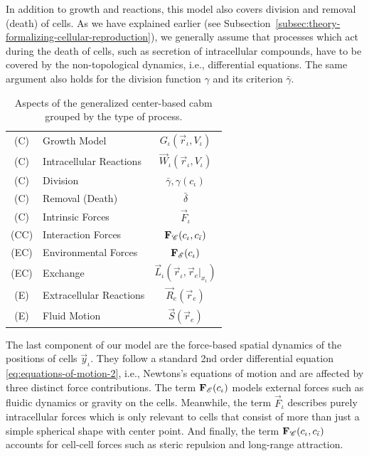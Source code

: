 In addition to growth and reactions, this model also covers division and removal (death) of cells.
As we have explained earlier (see Subsection~\ref{subsec:theory-formalizing-cellular-reproduction}),
we generally assume that processes which act during the death of cells, such as secretion of
intracellular compounds, have to be covered by the non-topological dynamics, i.e., differential
equations.
The same argument also holds for the division function $\gamma$ and its criterion $\bar{\gamma}$.

\begin{table}
    \centering
    \renewcommand{\arraystretch}{1.2}
    \begin{tabular}{clc}
        \toprule
        (C) & Growth Model              & $G_\iota(\vec{r}_\iota,V_\iota)$\\
        (C) & Intracellular Reactions   & $\vec{W}_\iota(\vec{r}_\iota,V_\iota)$\\
        (C) & Division                  & $\bar{\gamma},\gamma(c_\iota)$\\
        (C) & Removal (Death)           & $\bar{\delta}$\\
        (C) & Intrinsic Forces          & $\vec{F}_\iota$\\
        (CC) & Interaction Forces       & $\mathbf{F}_{\mathscr{C}}(c_\iota,c_{\bar{\iota}})$\\
        (EC) & Environmental Forces     & $\mathbf{F}_{\mathscr{E}}(c_\iota)$\\
        (EC) & Exchange                 & $\vec{L}_\iota(\vec{r}_\iota, \vec{r}_e|_{x_\iota})$\\
        (E) & Extracellular Reactions   & $\vec{R}_e(\vec{r}_e)$\\
        (E) & Fluid Motion              & $\vec{S}(\vec{r}_e)$\\
        \bottomrule
    \end{tabular}
    \caption[Components of the center-based system]{
        Aspects of the generalized center-based \ac{cabm} grouped by the type of process.
    }
    \label{table:overview-model-aspects}
\end{table}

The last component of our model are the force-based spatial dynamics of the positions of cells
$\vec{y}_\iota$.
They follow a standard 2nd order differential equation \eqref{eq:equations-of-motion-2}, i.e.,
Newtons's equations of motion and are affected by three distinct force contributions.
The term $\mathbf{F}_{\mathscr{E}}(c_\iota)$ models external forces such as fluidic dynamics or gravity on the
cells.
Meanwhile, the term $\vec{F}_\iota$ describes purely intracellular forces which is only
relevant to cells that consist of more than just a simple spherical shape with center point.
And finally, the term $\mathbf{F}_{\mathscr{C}}(c_\iota,c_{\bar{\iota}})$ accounts for cell-cell forces such as
steric repulsion and long-range attraction.


